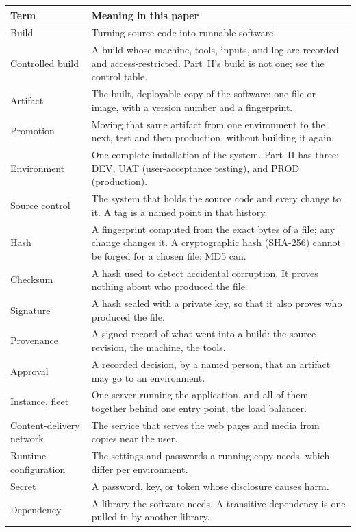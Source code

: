 \documentclass[11pt]{article}
\begin{document}
\begin{center}
\small
\begin{tabularx}{\textwidth}{@{}lX@{}}
\toprule
Term & Meaning in this paper \\
\midrule
Build & Turning source code into runnable software. \\
Controlled build & A build whose machine, tools, inputs, and log are recorded and access-restricted. Part~II's build is not one; see the control table. \\
Artifact & The built, deployable copy of the software: one file or image, with a version number and a fingerprint. \\
Promotion & Moving that same artifact from one environment to the next, test and then production, without building it again. \\
Environment & One complete installation of the system. Part~II has three: DEV, UAT (user-acceptance testing), and PROD (production). \\
Source control & The system that holds the source code and every change to it. A tag is a named point in that history. \\
Hash & A fingerprint computed from the exact bytes of a file; any change changes it. A cryptographic hash (SHA-256) cannot be forged for a chosen file; MD5 can. \\
Checksum & A hash used to detect accidental corruption. It proves nothing about who produced the file. \\
Signature & A hash sealed with a private key, so that it also proves who produced the file. \\
Provenance & A signed record of what went into a build: the source revision, the machine, the tools. \\
Approval & A recorded decision, by a named person, that an artifact may go to an environment. \\
Instance, fleet & One server running the application, and all of them together behind one entry point, the load balancer. \\
Content-delivery network & The service that serves the web pages and media from copies near the user. \\
Runtime configuration & The settings and passwords a running copy needs, which differ per environment. \\
Secret & A password, key, or token whose disclosure causes harm. \\
Dependency & A library the software needs. A transitive dependency is one pulled in by another library. \\

\end{tabularx}
\end{center}
\end{document}
